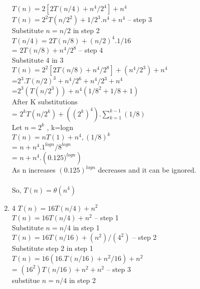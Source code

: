 \documentclass[11pt]{article}
\begin{document}
\begin{enumerate}
$T(n)=2[2T(n/4)+n^4/2^4] + n^4$ \\
$T(n) = 2^2 T(n/2^2) + 1/2^3.n^4+n^4$ -- step 3\\
Substitute  $n=n/2$ in step 2 \\
$T(n/4) = 2T(n/8)+(n/2)^4. 1/16$ \\
        = $2T(n/8) + n^4/2^8$  -- step 4\\

Substitute 4 in 3 \\

$T(n) = 2^2[2T(n/8) + n^4/2^8]+(n^4/2^3)+n^4$ \\
      =$2^3.T(n/2)^3+n^4/2^6+n^4/2^3+n^4 $\\
      =$2^3(T(n/2^3))+n^4(1/8^2 + 1/8 +1)$ \\

After K substitutions \\ 

=  $2^kT(n/2^k)+ ((2^k)^4).\sum_{k=1}^{k-1}(1/8)$ \\

Let $n = 2^k$ , k=logn \\

$T(n) = nT(1)+n^4,(1/8)^k$ \\
      = $n+n^4.{1^{log n}}/{8^{log n}}$ \\
      = $n+n^4.({0.125)^{log n}})$ \\

As n increases $(0.125)^{log n}$ decreases and it can be ignored.\\ \\

So, $T(n) = \theta(n^4)$


\item

4
$T(n) = 16T(n/4)+n^2 $  \\
$T(n) = 16T(n/4)+n^2 $ -- step 1 \\

Substitute $n=n/4$ in step 1 \\

$T(n) = 16T(n/16)+(n^2)/(4^2) $ -- step 2 \\

Substitute step 2 in step 1 \\

$T(n) = 16(16.T(n/16)+n^2/16)+n^2$ \\

     = $(16^2)T(n/16)+n^2+n^2$ -- step 3 \\

substitue $n=n/4$ in step 2 \\\\


\end{enumerate}
\end{document}
